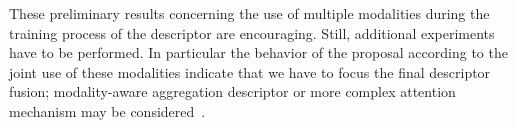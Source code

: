 These preliminary results concerning the use of multiple modalities during the training process of the descriptor are encouraging. Still, additional experiments have to be performed. In particular the behavior of the proposal according to the joint use of these modalities indicate that we have to focus the final descriptor fusion; modality-aware aggregation descriptor or more complex attention mechanism may be considered~\cite{Seymour2018}.